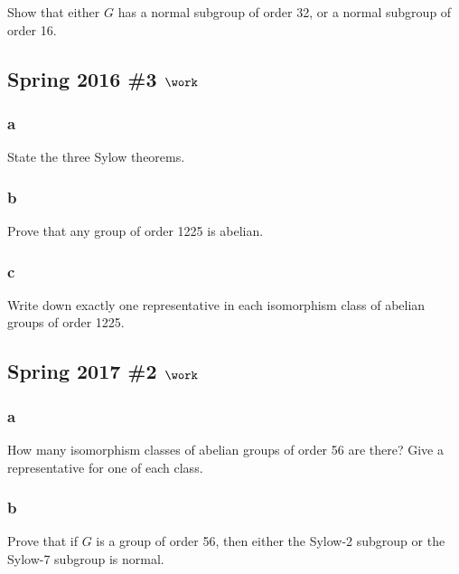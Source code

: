 Show that either \(G\) has a normal subgroup of order 32, or a normal
subgroup of order 16.

\hypertarget{spring-2016-3-work}{%
\subsection{\texorpdfstring{Spring 2016 \#3
\(\work\)}{Spring 2016 \#3 \textbackslash work}}\label{spring-2016-3-work}}

\hypertarget{a-6}{%
\subsubsection{a}\label{a-6}}

State the three Sylow theorems.

\hypertarget{b-6}{%
\subsubsection{b}\label{b-6}}

Prove that any group of order 1225 is abelian.

\hypertarget{c-4}{%
\subsubsection{c}\label{c-4}}

Write down exactly one representative in each isomorphism class of
abelian groups of order 1225.

\hypertarget{spring-2017-2-work}{%
\subsection{\texorpdfstring{Spring 2017 \#2
\(\work\)}{Spring 2017 \#2 \textbackslash work}}\label{spring-2017-2-work}}

\hypertarget{a-7}{%
\subsubsection{a}\label{a-7}}

How many isomorphism classes of abelian groups of order 56 are there?
Give a representative for one of each class.

\hypertarget{b-7}{%
\subsubsection{b}\label{b-7}}

Prove that if \(G\) is a group of order 56, then either the Sylow-2
subgroup or the Sylow-7 subgroup is normal.

